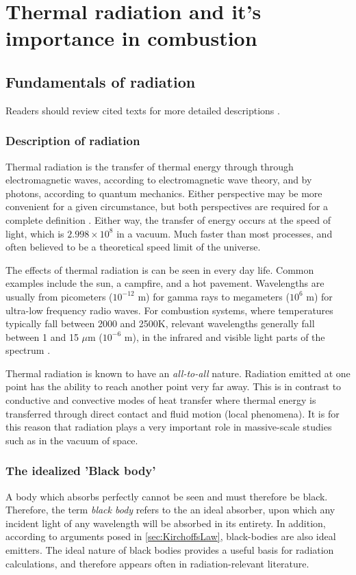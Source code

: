 \addchapheadtotoc
\chapter{Thermal radiation and it's importance in combustion}\label{chapter:Importance}

\section{Fundamentals of radiation} \label{Sec:FundOfRad}

Readers should review cited texts for more detailed descriptions \cite{Howell2010ThermalTransfer,Modest2013RadiativeTransfer}.

\subsection{Description of radiation}
Thermal radiation is the transfer of thermal energy through through electromagnetic waves, according to electromagnetic wave theory, and by photons, according to quantum mechanics. 
Either perspective may be more convenient for a given circumstance, but both perspectives are required for a complete definition \cite{Modest2013RadiativeTransfer}. Either way, the transfer of energy occurs at the speed of light, which is $2.998 \times 10^8$ in a vacuum.
Much faster than most processes, and often believed to be a theoretical speed limit of the universe.

The effects of thermal radiation is can be seen in every day life. Common examples include the sun, a campfire, and a hot pavement. 
Wavelengths are usually from picometers ($10^{-12}$ m) for gamma rays to megameters ($10^6$ m) for ultra-low frequency radio waves.
For combustion systems, where temperatures typically fall between 2000 and 2500K, relevant wavelengths generally fall between 1 and 15 $\mu{}$m ($10^{-6}$ m), in the infrared and visible light parts of the spectrum \cite{Liu2020TheFlames}.

Thermal radiation is known to have an \textit{all-to-all} nature. Radiation emitted at one point has the ability to reach another point very far away. 
This is in contrast to conductive and convective modes of heat transfer where thermal energy is transferred through direct contact and fluid motion (local phenomena). 
It is for this reason that radiation plays a very important role in massive-scale studies such as in the vacuum of space.

\subsection{The idealized 'Black body'}
A body which absorbs perfectly cannot be seen and must therefore be black. Therefore, the term \textit{black body} refers to the an ideal absorber, upon which any incident light of any wavelength will be absorbed in its entirety. In addition, according to arguments posed in \ref{sec:KirchoffsLaw}, black-bodies are also ideal emitters.
The ideal nature of black bodies provides a useful basis for radiation calculations, and therefore appears often in radiation-relevant literature.

